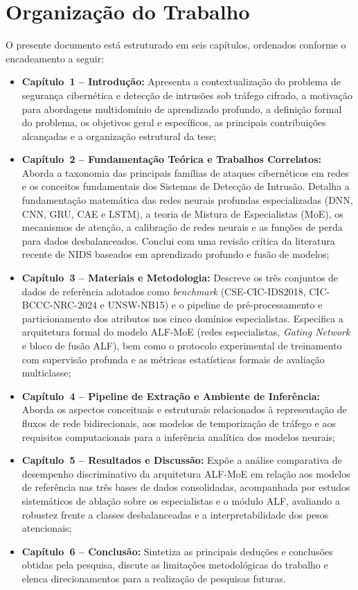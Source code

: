 \section{Organização do Trabalho}
\label{sec:organizacao}

O presente documento está estruturado em seis capítulos, ordenados conforme o encadeamento a seguir:
\begin{itemize}
    \item \textbf{Capítulo~1 -- Introdução:} Apresenta a contextualização do problema de segurança cibernética e detecção de intrusões sob tráfego cifrado, a motivação para abordagens multidomínio de aprendizado profundo, a definição formal do problema, os objetivos geral e específicos, as principais contribuições alcançadas e a organização estrutural da tese;
    \item \textbf{Capítulo~2 -- Fundamentação Teórica e Trabalhos Correlatos:} Aborda a taxonomia das principais famílias de ataques cibernéticos em redes e os conceitos fundamentais dos Sistemas de Detecção de Intrusão. Detalha a fundamentação matemática das redes neurais profundas especializadas (DNN, CNN, GRU, CAE e LSTM), a teoria de Mistura de Especialistas (MoE), os mecanismos de atenção, a calibração de redes neurais e as funções de perda para dados desbalanceados. Conclui com uma revisão crítica da literatura recente de NIDS baseados em aprendizado profundo e fusão de modelos;
    \item \textbf{Capítulo~3 -- Materiais e Metodologia:} Descreve os três conjuntos de dados de referência adotados como \emph{benchmark} (CSE-CIC-IDS2018, CIC-BCCC-NRC-2024 e UNSW-NB15) e o pipeline de pré-processamento e particionamento dos atributos nos cinco domínios especialistas. Especifica a arquitetura formal do modelo ALF-MoE (redes especialistas, \emph{Gating Network} e bloco de fusão ALF), bem como o protocolo experimental de treinamento com supervisão profunda e as métricas estatísticas formais de avaliação multiclasse;
    \item \textbf{Capítulo~4 -- Pipeline de Extração e Ambiente de Inferência:} Aborda os aspectos conceituais e estruturais relacionados à representação de fluxos de rede bidirecionais, aos modelos de temporização de tráfego e aos requisitos computacionais para a inferência analítica dos modelos neurais;
    \item \textbf{Capítulo~5 -- Resultados e Discussão:} Expõe a análise comparativa de desempenho discriminativo da arquitetura ALF-MoE em relação aos modelos de referência nas três bases de dados consolidadas, acompanhada por estudos sistemáticos de ablação sobre os especialistas e o módulo ALF, avaliando a robustez frente a classes desbalanceadas e a interpretabilidade dos pesos atencionais;
    \item \textbf{Capítulo~6 -- Conclusão:} Sintetiza as principais deduções e conclusões obtidas pela pesquisa, discute as limitações metodológicas do trabalho e elenca direcionamentos para a realização de pesquisas futuras.
\end{itemize}
